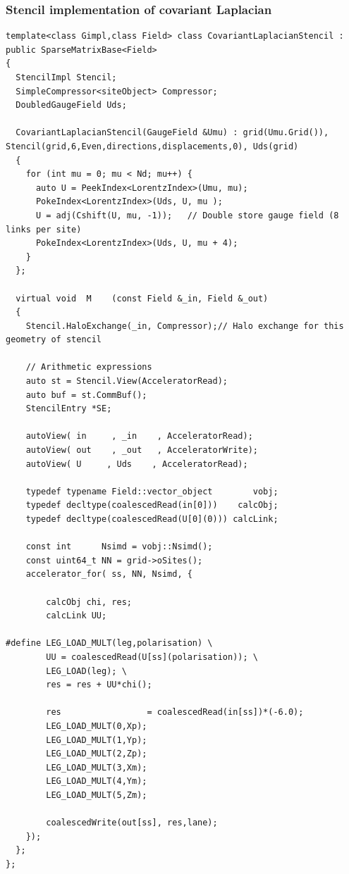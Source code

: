 \documentclass[pdf,ps,8pt]{beamer}
\newcommand{\miniscule}{\fontsize{3pt}{4pt}\selectfont}
\begin{document}
\begin{frame}[fragile]\small\frametitle{ Stencil implementation of covariant Laplacian}
{\miniscule
\begin{verbatim}
template<class Gimpl,class Field> class CovariantLaplacianStencil : public SparseMatrixBase<Field>
{
  StencilImpl Stencil;
  SimpleCompressor<siteObject> Compressor;
  DoubledGaugeField Uds;

  CovariantLaplacianStencil(GaugeField &Umu) : grid(Umu.Grid()), Stencil(grid,6,Even,directions,displacements,0), Uds(grid)
  {
    for (int mu = 0; mu < Nd; mu++) {
      auto U = PeekIndex<LorentzIndex>(Umu, mu);
      PokeIndex<LorentzIndex>(Uds, U, mu );
      U = adj(Cshift(U, mu, -1));   // Double store gauge field (8 links per site)
      PokeIndex<LorentzIndex>(Uds, U, mu + 4);
    }
  };

  virtual void  M    (const Field &_in, Field &_out)
  {
    Stencil.HaloExchange(_in, Compressor);// Halo exchange for this geometry of stencil

    // Arithmetic expressions
    auto st = Stencil.View(AcceleratorRead);
    auto buf = st.CommBuf();
    StencilEntry *SE;

    autoView( in     , _in    , AcceleratorRead);
    autoView( out    , _out   , AcceleratorWrite);
    autoView( U     , Uds    , AcceleratorRead);

    typedef typename Field::vector_object        vobj;
    typedef decltype(coalescedRead(in[0]))    calcObj;
    typedef decltype(coalescedRead(U[0](0))) calcLink;

    const int      Nsimd = vobj::Nsimd();
    const uint64_t NN = grid->oSites();
    accelerator_for( ss, NN, Nsimd, {

        calcObj chi, res;
        calcLink UU;

#define LEG_LOAD_MULT(leg,polarisation)	\
        UU = coalescedRead(U[ss](polarisation)); \
        LEG_LOAD(leg); \
        res = res + UU*chi();			        
	
        res                 = coalescedRead(in[ss])*(-6.0);
        LEG_LOAD_MULT(0,Xp);
        LEG_LOAD_MULT(1,Yp);
        LEG_LOAD_MULT(2,Zp);
        LEG_LOAD_MULT(3,Xm);
        LEG_LOAD_MULT(4,Ym);
        LEG_LOAD_MULT(5,Zm);

        coalescedWrite(out[ss], res,lane);
    });
  };
};
\end{verbatim}
}
\end{frame}
\end{document}
